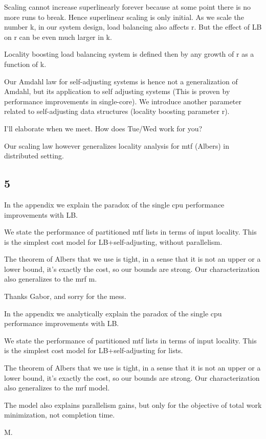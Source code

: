 Scaling cannot increase superlinearly forever because at some point there is no more runs to break. Hence superlinear scaling is only initial. As we scale the number k, in our system design, load balancing also affects r. But the effect of LB on r can be even much larger in k.

Locality boosting load balancing system is defined then by any growth of r as a function of k.



Our Amdahl law for self-adjusting systems is hence not a generalization of Amdahl, but its application to self adjusting systems (This is proven by performance improvements in single-core). We introduce another parameter related to self-adjusting  data structures (locality boosting parameter r).









I'll elaborate when we meet. How does Tue/Wed work for you?


Our scaling law however generalizes locality analysis for mtf (Albers) in distributed setting.

\subsection{5}



In the appendix we explain the paradox of the single cpu performance improvements with LB.

We state the performance of partitioned mtf lists in terms of input locality. This is the simplest cost model for LB+self-adjusting, without parallelism.

The theorem of Albers that we use is tight, in a sense that it is not an upper or a lower bound, it's exactly the cost, so our bounds are strong. Our characterization also generalizes to the mrf m.







Thanks Gabor, and sorry for the mess.

In the appendix we analytically explain the paradox of the single cpu performance improvements with LB.

We state the performance of partitioned mtf lists in terms of input locality. This is the simplest cost model for LB+self-adjusting for lists.

The theorem of Albers that we use is tight, in a sense that it is not an upper or a lower bound, it's exactly the cost, so our bounds are strong. Our characterization also generalizes to the mrf model.

The model also explains parallelism gains, but only for the objective of total work minimization, not completion time.

M.